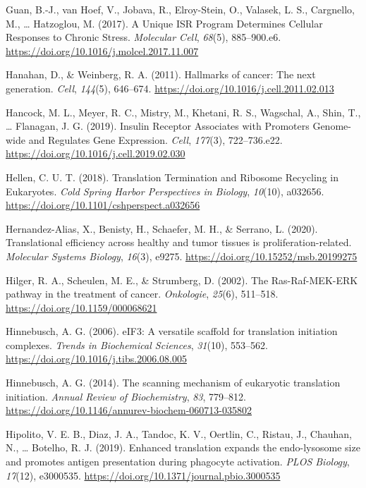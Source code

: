 \documentclass[12pt,openany]{book}
\begin{document}
\hypertarget{ref-Guan2017}{}
Guan, B.-J., van Hoef, V., Jobava, R., Elroy-Stein, O., Valasek, L. S.,
Cargnello, M., \ldots{} Hatzoglou, M. (2017). A Unique ISR Program
Determines Cellular Responses to Chronic Stress. \emph{Molecular Cell},
\emph{68}(5), 885--900.e6.
\url{https://doi.org/10.1016/j.molcel.2017.11.007}

\hypertarget{ref-Hanahan2011}{}
Hanahan, D., \& Weinberg, R. A. (2011). Hallmarks of cancer: The next
generation. \emph{Cell}, \emph{144}(5), 646--674.
\url{https://doi.org/10.1016/j.cell.2011.02.013}

\hypertarget{ref-Hancock2019}{}
Hancock, M. L., Meyer, R. C., Mistry, M., Khetani, R. S., Wagschal, A.,
Shin, T., \ldots{} Flanagan, J. G. (2019). Insulin Receptor Associates
with Promoters Genome-wide and Regulates Gene Expression. \emph{Cell},
\emph{177}(3), 722--736.e22.
\url{https://doi.org/10.1016/j.cell.2019.02.030}

\hypertarget{ref-Hellen2018}{}
Hellen, C. U. T. (2018). Translation Termination and Ribosome Recycling
in Eukaryotes. \emph{Cold Spring Harbor Perspectives in Biology},
\emph{10}(10), a032656.
\url{https://doi.org/10.1101/cshperspect.a032656}

\hypertarget{ref-Hernandez-Alias2020}{}
Hernandez-Alias, X., Benisty, H., Schaefer, M. H., \& Serrano, L.
(2020). Translational efficiency across healthy and tumor tissues is
proliferation-related. \emph{Molecular Systems Biology}, \emph{16}(3),
e9275. \url{https://doi.org/10.15252/msb.20199275}

\hypertarget{ref-Hilger2002}{}
Hilger, R. A., Scheulen, M. E., \& Strumberg, D. (2002). The
Ras-Raf-MEK-ERK pathway in the treatment of cancer. \emph{Onkologie},
\emph{25}(6), 511--518. \url{https://doi.org/10.1159/000068621}

\hypertarget{ref-Hinnebusch2006}{}
Hinnebusch, A. G. (2006). eIF3: A versatile scaffold for translation
initiation complexes. \emph{Trends in Biochemical Sciences},
\emph{31}(10), 553--562.
\url{https://doi.org/10.1016/j.tibs.2006.08.005}

\hypertarget{ref-Hinnebusch2014}{}
Hinnebusch, A. G. (2014). The scanning mechanism of eukaryotic
translation initiation. \emph{Annual Review of Biochemistry}, \emph{83},
779--812. \url{https://doi.org/10.1146/annurev-biochem-060713-035802}

\hypertarget{ref-Hipolito2019}{}
Hipolito, V. E. B., Diaz, J. A., Tandoc, K. V., Oertlin, C., Ristau, J.,
Chauhan, N., \ldots{} Botelho, R. J. (2019). Enhanced translation
expands the endo-lysosome size and promotes antigen presentation during
phagocyte activation. \emph{PLOS Biology}, \emph{17}(12), e3000535.
\url{https://doi.org/10.1371/journal.pbio.3000535}
\end{document}

